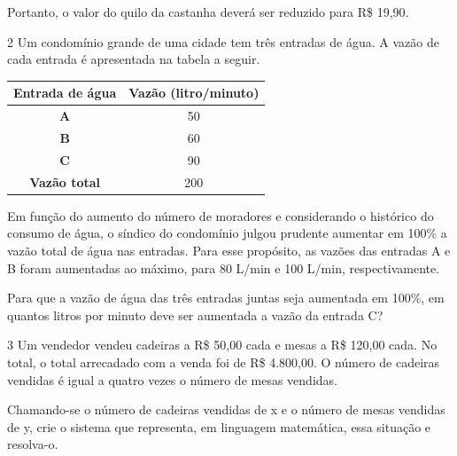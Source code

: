 {{{Portanto, o valor do quilo da castanha deverá ser reduzido para R\$ 19,90.

\num{2} Um condomínio grande de uma cidade tem três entradas de água. A
vazão de cada entrada é apresentada na tabela a seguir.

\begin{table}[]
\begin{tabular}{|cc}
\hline
\textbf{Entrada de água} & \multicolumn{1}{c|}{\textbf{Vazão (litro/minuto)}} \\ \hline
\textbf{A} & 50 \\ \hline
\textbf{B} & 60 \\ \hline
\textbf{C} & 90 \\ \hline
\textbf{Vazão total} & 200 \\ \hline
\end{tabular}
\end{table}

Em função do aumento do número de moradores e considerando o histórico
do consumo de água, o síndico do condomínio julgou prudente aumentar em
100\% a vazão total de água nas entradas. Para esse propósito,
as vazões das entradas A e B foram aumentadas ao máximo, para 80 L/min e
100 L/min, respectivamente.

Para que a vazão de água das três entradas juntas seja aumentada em
100\%, em quantos litros por minuto deve ser aumentada a vazão da entrada C?



\num{3} Um vendedor vendeu cadeiras a R\$ 50,00 cada e mesas a R\$ 120,00
cada. No total, o total arrecadado com a venda foi de R\$ 4.800,00. O número 
de cadeiras vendidas é igual a quatro vezes o número de mesas vendidas.

Chamando-se o número de cadeiras vendidas de x e o número de mesas
vendidas de y, crie o sistema que representa, em linguagem
matemática, essa situação e resolva-o.


\coment{

}}}}
